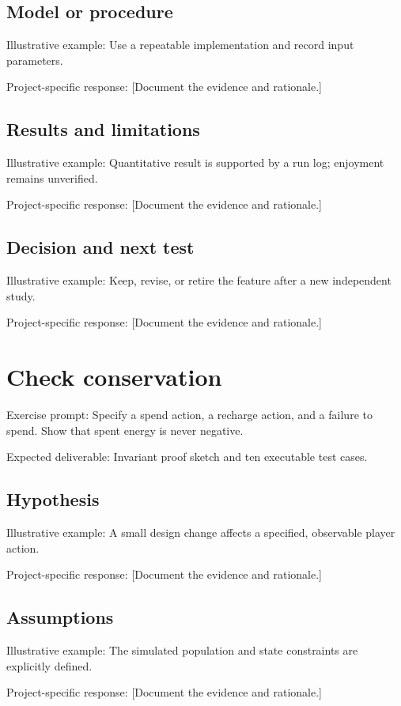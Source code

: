 \documentclass[11pt]{article}
\begin{document}
\subsection{Model or procedure}
Illustrative example: Use a repeatable implementation and record input parameters.

Project-specific response: [Document the evidence and rationale.]


\subsection{Results and limitations}
Illustrative example: Quantitative result is supported by a run log; enjoyment remains unverified.

Project-specific response: [Document the evidence and rationale.]


\subsection{Decision and next test}
Illustrative example: Keep, revise, or retire the feature after a new independent study.

Project-specific response: [Document the evidence and rationale.]


\section{Check conservation}
Exercise prompt: Specify a spend action, a recharge action, and a failure to spend. Show that spent energy is never negative.

Expected deliverable: Invariant proof sketch and ten executable test cases.


\subsection{Hypothesis}
Illustrative example: A small design change affects a specified, observable player action.

Project-specific response: [Document the evidence and rationale.]


\subsection{Assumptions}
Illustrative example: The simulated population and state constraints are explicitly defined.

Project-specific response: [Document the evidence and rationale.]
\end{document}
